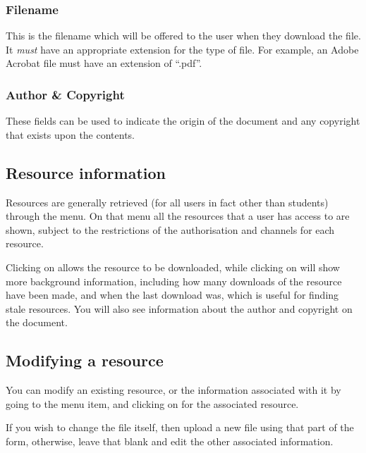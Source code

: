 \documentclass[12 pt]{book}
\begin{document}
\subsubsection{Filename}

This is the filename which will be offered to the user when they download the file.
It \emph{must} have an appropriate extension for the type of file. For example,
an Adobe Acrobat file must have an extension of ``.pdf''.

\subsubsection{Author \& Copyright}

These fields can be used to indicate the origin of the document and any
copyright that exists upon the contents.


\subsection{Resource information}

Resources are generally retrieved (for all users in fact other than students) 
through the 
menu. On that menu all the resources that a user has access to are shown,
subject to the restrictions of the authorisation and channels for each
resource.

Clicking on  allows the resource to be downloaded, while
clicking on  will show more background information,
including how many downloads of the resource have been made, and when
the last download was, which is useful for finding stale resources.
You will also see information about the author and copyright on the
document.

\subsection{Modifying a resource}

You can modify an existing resource, or the information associated with
it by going to the 
menu item, and clicking on  for the associated resource.

If you wish to change the file itself, then upload a new file using
that part of the form, otherwise, leave that blank and edit the other
associated information.
\end{document}
